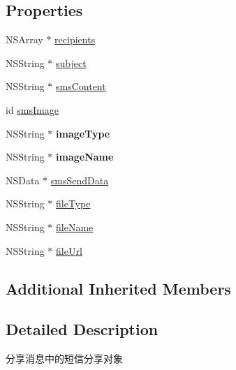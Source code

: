 \subsection*{Properties}
\begin{DoxyCompactItemize}
\item 
N\+S\+Array $\ast$ \mbox{\hyperlink{interface_u_m_share_sms_object_a5bdd11e9a2f53f3529f4ab93896e2abb}{recipients}}
\item 
N\+S\+String $\ast$ \mbox{\hyperlink{interface_u_m_share_sms_object_a79e7fbcf1a1411036f9457361c1308d0}{subject}}
\item 
N\+S\+String $\ast$ \mbox{\hyperlink{interface_u_m_share_sms_object_ab8f2c4c6bd366cd8d875da8daa95b5db}{sms\+Content}}
\item 
id \mbox{\hyperlink{interface_u_m_share_sms_object_af4bf871319630311ce1d0b2599f78f00}{sms\+Image}}
\item 
\mbox{\label{interface_u_m_share_sms_object_ad6f447a917f86380f1dd3a0e23032a2f}} 
N\+S\+String $\ast$ {\bfseries image\+Type}
\item 
\mbox{\label{interface_u_m_share_sms_object_a0579bba6cf2ee1fa108d2d9639309c64}} 
N\+S\+String $\ast$ {\bfseries image\+Name}
\item 
N\+S\+Data $\ast$ \mbox{\hyperlink{interface_u_m_share_sms_object_addc9ab4af148e82fb5a5e02e83d3c4c5}{sms\+Send\+Data}}
\item 
N\+S\+String $\ast$ \mbox{\hyperlink{interface_u_m_share_sms_object_aeb91061dd25df4ed3bf71c9aa4c020f3}{file\+Type}}
\item 
N\+S\+String $\ast$ \mbox{\hyperlink{interface_u_m_share_sms_object_a3957b5354620293217fc1c215d57c2c5}{file\+Name}}
\item 
N\+S\+String $\ast$ \mbox{\hyperlink{interface_u_m_share_sms_object_ade55cf9f0840c8bafc67f06f4e1502c3}{file\+Url}}
\end{DoxyCompactItemize}
\subsection*{Additional Inherited Members}


\subsection{Detailed Description}
分享消息中的短信分享对象 

